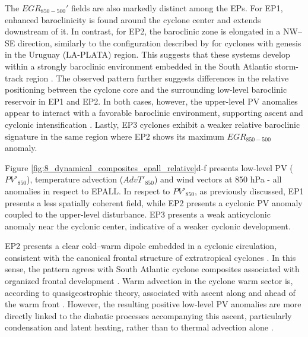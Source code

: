 \documentclass[pdflatex,sn-chicago]{sn-jnl}%
\theoremstyle{plain}
\theoremstyle{definition}
\theoremstyle{remark}
\theoremstyle{definition}
\begin{document}
The $EGR_{850-500}'$ fields are also markedly distinct among the EPs. For EP1, enhanced baroclinicity is found around the cyclone center and extends downstream of it. In contrast, for EP2, the baroclinic zone is elongated in a NW--SE direction, similarly to the configuration described by \citet{crespo2021potential} for cyclones with genesis in the Uruguay (LA-PLATA) region. This suggests that these systems develop within a strongly baroclinic environment embedded in the South Atlantic storm-track region \citep{hoskins1990existence,chang2002storm,hoskins2005new}. The observed pattern further suggests differences in the relative positioning between the cyclone core and the surrounding low-level baroclinic reservoir in EP1 and EP2. In both cases, however, the upper-level PV anomalies appear to interact with a favorable baroclinic environment, supporting ascent and cyclonic intensification \citep{davis1991potential,huo1999interaction,besson2021global,crespo2021potential}. Lastly, EP3 cyclones exhibit a weaker relative baroclinic signature in the same region where EP2 shows its maximum $EGR_{850-500}$ anomaly.
 

Figure \ref{fig:8_dynamical_composites_epall_relative}d-f presents low-level PV ($PV'_{850}$), temperature advection ($AdvT'_{850}$) and wind vectors at 850 hPa - all anomalies in respect to EPALL. In respect to $PV'_{850}$, as previously discussed, EP1 presents a less spatially coherent field, while EP2 presents a cyclonic PV anomaly coupled to the upper-level disturbance. EP3 presents a weak anticyclonic anomaly near the cyclonic center, indicative of a weaker cyclonic development.

EP2 presents a clear cold--warm dipole embedded in a cyclonic circulation, consistent with the canonical frontal structure of extratropical cyclones \citep[e.g.][]{dacre2025kinematic}. In this sense, the pattern agrees with South Atlantic cyclone composites associated with organized frontal development \citep{gramcianinov2019properties}. Warm advection in the cyclone warm sector is, according to quasigeostrophic theory, associated with ascent along and ahead of the warm front \citep{davies2015quasigeostrophic}. However, the resulting positive low-level PV anomalies are more directly linked to the diabatic processes accompanying this ascent, particularly condensation and latent heating, rather than to thermal advection alone \citep{hoskins1985use,huo1999interaction,attinger2021systematic}.
\end{document}
